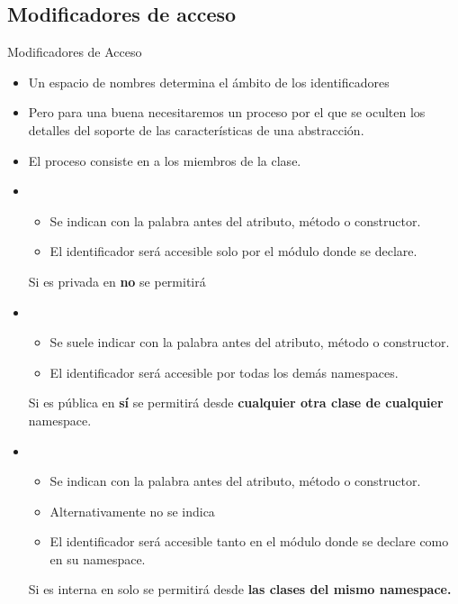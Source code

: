 \documentclass[10pt,envcountsect,spanish]{beamer}
\begin{document}
\subsection{Modificadores de acceso}



\begin{frame}{Modificadores de Acceso} 
\begin{itemize}
\item Un espacio de nombres determina el ámbito de los identificadores

\item Pero para una buena  necesitaremos un proceso por el que se oculten los detalles del soporte de las características de una abstracción.

\item El proceso consiste en  a los miembros de la clase.

\item {}
    \begin{itemize}
	\item Se indican con la palabra  antes del atributo, método o constructor.
	\item El identificador será accesible solo por el módulo donde se declare.
	\end{itemize} 

{\small \unEjemplo Si  es privada en  \textbf{no} se permitirá }

\item {}
    \begin{itemize}
	\item Se suele indicar con la palabra  antes del atributo, método o constructor.
	\item El identificador será accesible por todas los demás namespaces.
	\end{itemize} 

{\small \unEjemplo Si  es pública en  \textbf{sí} se permitirá  desde \textbf{cualquier otra clase de cualquier} namespace.}


\item  {}
    \begin{itemize}
	\item Se indican con la palabra  antes del atributo, método o constructor.
	\item Alternativamente no se indica 
	\item El identificador será accesible tanto en el módulo donde se declare como en su namespace.
	\end{itemize} 
{\small \unEjemplo Si  es interna en  solo se permitirá  desde  \textbf{las clases del mismo namespace.}}
\end{itemize}
\end{frame}
\end{document}

